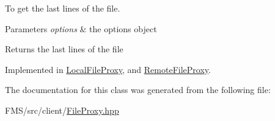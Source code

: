 To get the last lines of the file. 


\begin{DoxyParams}{Parameters}
{\em options} & the options object \\
\hline
\end{DoxyParams}
\begin{DoxyReturn}{Returns}
the last lines of the file 
\end{DoxyReturn}


Implemented in \hyperlink{classLocalFileProxy_aee171fefc216520156fd652b326bfb66}{LocalFileProxy}, and \hyperlink{classRemoteFileProxy_a45f18885dee050419b72e36283031bdb}{RemoteFileProxy}.



The documentation for this class was generated from the following file:\begin{DoxyCompactItemize}
\item 
FMS/src/client/\hyperlink{FileProxy_8hpp}{FileProxy.hpp}\end{DoxyCompactItemize}
